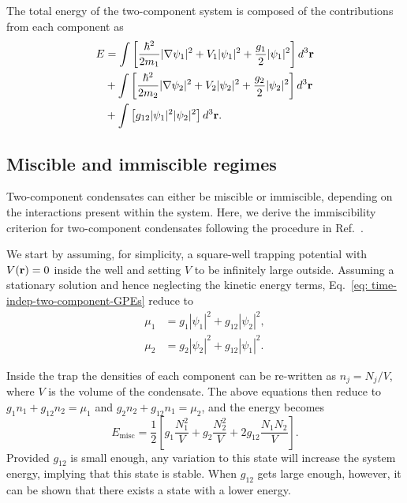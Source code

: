 The total energy of the two-component system is composed of the contributions
from each component as
\begin{equation}
    \begin{aligned}
        E & = \int \left[\frac{\hbar^2}{2m_1}|\nabla\psi_1|^2
        + V_1|\psi_1|^2 + \frac{g_1}{2}|\psi_1|^2 \right] d^3\vb{r}   \\
          & + \int \left[\frac{\hbar^2}{2m_2}|\nabla\psi_2|^2
        + V_2|\psi_2|^2 + \frac{g_2}{2}|\psi_2|^2 \right] d^3\vb{r}   \\
          & + \int \left[g_{12}|\psi_1|^2|\psi_2|^2\right] d^3\vb{r}.
    \end{aligned}
\end{equation}

\subsection{Miscible and immiscible regimes}
Two-component condensates can either be miscible or immiscible, depending on
the interactions present within the system.
Here, we derive the immiscibility criterion for two-component condensates
following the procedure in Ref.~\cite{Ao1998}.

We start by assuming, for simplicity, a square-well trapping potential with
\(V(\vb{r}) = 0\) inside the well and setting \(V\) to be infinitely large
outside.
Assuming a stationary solution and hence neglecting the kinetic energy
terms, Eq.~\eqref{eq: time-indep-two-component-GPEs} reduce to
\begin{equation}
    \begin{aligned}
        \mu_1 & = g_1|\psi_1|^2 + g_{12}|\psi_2|^2, \\
        \mu_2 & = g_2|\psi_2|^2 + g_{12}|\psi_1|^2.
    \end{aligned}
\end{equation}

Inside the trap the densities of each component can be re-written as
\(n_j=N_j/V\), where \(V\) is the volume of the condensate.
The above equations then reduce to \(g_1n_1 + g_{12}n_2 = \mu_1\) and
\(g_2n_2 + g_{12}n_1 = \mu_2\), and the energy becomes
\begin{equation}
    E_\mathrm{misc} = \frac{1}{2}\left[g_1\frac{N_1^2}{V} + g_2\frac{N_2^2}{V}
        + 2g_{12}\frac{N_1N_2}{V}\right].
\end{equation}
Provided \(g_{12}\) is small enough, any variation to this state will increase
the system energy, implying that this state is stable.
When \(g_{12}\) gets large enough, however, it can be shown that there exists
a state with a lower energy.

